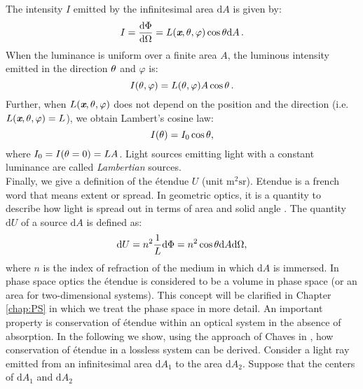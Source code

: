 The intensity $I$ emitted by the infinitesimal area $\textrm{d}A$ is given by:
\begin{equation}\label{eq:int_lum}
I = \frac{\textrm{d}\Phi}{\textrm{d}\Omega}= L(\textit{\textbf{x}},\theta, \varphi)\cos\theta\textrm{d}A \,.
\end{equation}
When the luminance is uniform over a finite area $A$, the luminous intensity emitted in the direction $\theta$ and $\varphi$ is:
\begin{equation}
I(\theta, \varphi) = L(\theta, \varphi) A \cos\theta\,.
\end{equation}
Further, when $L(\textit{\textbf{x}},\theta, \varphi)$ does not depend on the position and the direction (i.e. $L(\textit{\textbf{x}},\theta, \varphi)=L$), we obtain Lambert's cosine law:
\begin{equation}
I(\theta) = I_0\cos\theta ,
\end{equation}
where $I_0 = I(\theta = 0) = LA$. Light sources emitting light with a constant luminance are called \textit{Lambertian} sources.\\
\indent Finally, we give a definition of the \'{e}tendue $U$ (unit $\textrm{m}^2\textrm{sr}$).
Etendue is a french word that means extent or spread. In geometric optics, it is a quantity to describe how light is spread out in terms of area and solid angle \cite{lerner2006etendue, zhu2011etendue}.
The quantity $ \textrm{d}U $ of a source $\textrm{d}A$ is defined as:
\begin{equation}\label{etendue}
\textrm{d}U = n^2  \frac{1}{L}\textrm{d}\Phi = n^2 \cos\theta\textrm{d}A\textrm{d}\Omega,
\end{equation}
where $n$ is the index of refraction of the medium in which $\textrm{d}A$ is immersed. In phase space optics the \'{e}tendue is considered to be a volume in phase space (or an area for two-dimensional systems). This concept will be clarified in Chapter \ref{chap:PS} in which we treat the phase space in more detail.
An important property is conservation of \'{e}tendue within an optical system in the absence of absorption. 
In the following we show, using the approach of Chaves in \cite{chaves2015introduction}, 
how conservation of \'{e}tendue in a lossless system can be derived. 
Consider a light ray emitted from an infinitesimal area $\textrm{d}A_1$ to the area $\textrm{d}A_2$. Suppose that the centers of $\textrm{d}A_1$ and $\textrm{d}A_2$ 
